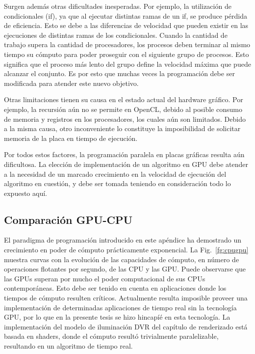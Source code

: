 Surgen además otras dificultades inesperadas.
Por ejemplo, la utilización de condicionales (if), ya que al ejecutar distintas ramas de un if, se produce pérdida de eficiencia.
Esto se debe a las diferencias de velocidad que pueden existir en las ejecuciones de distintas ramas de los condicionales.
Cuando la cantidad de trabajo supera la cantidad de procesadores, los procesos deben terminar al mismo tiempo su cómputo para poder proseguir con el siguiente grupo de procesos.
Esto significa que el proceso más lento del grupo define la velocidad máxima que puede alcanzar el conjunto.
Es por esto que muchas veces la programación debe ser modificada para atender este nuevo objetivo.

Otras limitaciones tienen su causa en el estado actual del hardware gráfico.
Por ejemplo, la recursión aún no se permite en OpenCL, debido al posible consumo de memoria y registros en los procesadores, los cuales aún son limitados.
Debido a la misma causa, otro inconveniente lo constituye la imposibilidad de solicitar memoria de la placa en tiempo de ejecución.

Por todos estos factores, la programación paralela en placas gráficas resulta aún dificultosa.
La elección de implementación de un algoritmo en GPU debe atender a la necesidad de un marcado crecimiento en la velocidad de ejecución del algoritmo en cuestión, y debe ser tomada teniendo en consideración todo lo expuesto aquí.

\subsection{Comparación GPU-CPU}
El paradigma de programación introducido en este apéndice ha demostrado un crecimiento en poder de cómputo prácticamente exponencial.
La Fig.~\ref{fg:cpugpu} muestra curvas con la evolución de las capacidades de cómputo, en número de operaciones flotantes por segundo, de las CPU y las GPU.
Puede observarse que las GPUs superan por mucho el poder computacional de sus CPUs contemporáneas.
Esto debe ser tenido en cuenta en aplicaciones donde los tiempos de cómputo resulten críticos.
Actualmente resulta imposible proveer una implementación de determinadas aplicaciones de tiempo real sin la tecnología GPU, por lo que en la presente tesis se hizo hincapíé en esta tecnología.
La implementación del modelo de iluminación DVR del capítulo de renderizado está basada en shaders, donde el cómputo resultó trivialmente paralelizable, resultando en un algoritmo de tiempo real.


